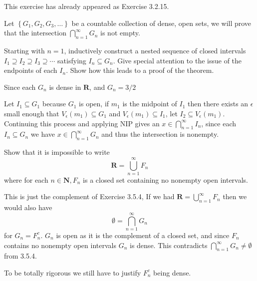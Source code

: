 \begin{solution}
  This exercise has already appeared as Exercise 3.2.15.
\end{solution}

\begin{exercise}
  Let $\left\{G_{1}, G_{2}, G_{3}, \ldots\right\}$ be a countable collection of dense, open sets, we will prove that the intersection $\bigcap_{n=1}^{\infty} G_{n}$ is not empty.

  Starting with $n=1$, inductively construct a nested sequence of closed intervals $I_{1} \supseteq I_{2} \supseteq I_{3} \supseteq \cdots$ satisfying $I_{n} \subseteq G_{n}$. Give special attention to the issue of the endpoints of each $I_{n}$. Show how this leads to a proof of the theorem.
\end{exercise}

\begin{solution}
  Since each $G_n$ is dense in $\mathbf R$, and $G_n = 3/2$

  Let $I_1 \subseteq G_1$ because $G_1$ is open, if $m_1$ is the midpoint of $I_1$ then there exists an $\epsilon$ small enough that $V_\epsilon(m_1) \subseteq G_1$ and $V_\epsilon(m_1) \subseteq I_1$, let $I_2 \subseteq V_\epsilon(m_1)$. Continuing this process and applying NIP gives an $x \in \bigcap_{n=1}^\infty I_n$, since each $I_n \subseteq G_n$ we have $x \in \bigcap_{n=1}^\infty G_n$ and thus the intersection is nonempty.
\end{solution}

\begin{exercise}
  Show that it is impossible to write
  $$
  \mathbf{R}=\bigcup_{n=1}^{\infty} F_{n}
  $$
  where for each $n \in \mathbf{N}, F_{n}$ is a closed set containing no nonempty open intervals.
\end{exercise}

\begin{solution}
  This is just the complement of Exercise 3.5.4, If we had $\mathbf R = \bigcup_{n=1}^\infty F_n$ then we would also have
  $$\emptyset = \bigcap_{n=1}^\infty G_n$$
  for $G_n = F_n^c$. $G_n$ is open as it is the complement of a closed set, and since $F_n$ contains no nonempty open intervals $G_n$ is dense. This contradicts $\bigcap_{n=1}^\infty G_n \ne \emptyset$  from 3.5.4.

  To be totally rigorous we still have to justify $F_n^c$ being dense. \TODO
\end{solution}
